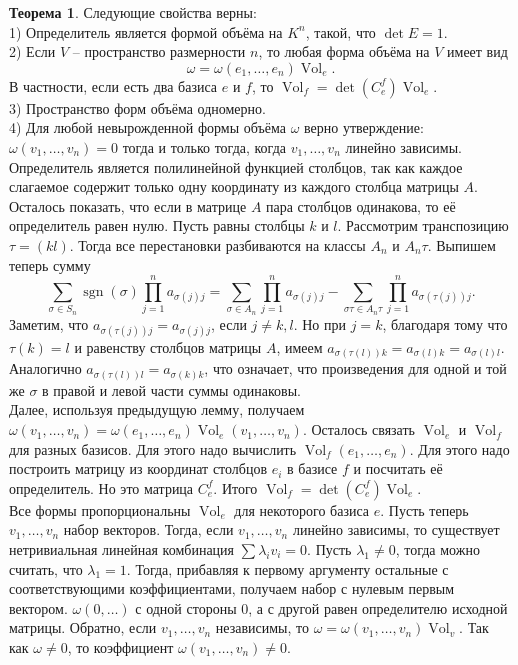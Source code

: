 \documentclass[10pt,a4paper,oneside]{book} %
\theoremstyle{definition}
\newtheorem{thm}{Теорема}
\newcommand{\Vol}{\operatorname{Vol}}
\newcommand{\sgn}{\operatorname{sgn}}
\begin{document}
\begin{thm} Следующие свойства верны:\\
1) Определитель является формой объёма на $K^n$, такой, что $\det E=1$.\\
2) Если $V$ -- пространство размерности $n$, то любая форма объёма на $V$ имеет вид $$\omega=\omega(e_1,\dots,e_n)\Vol_e.$$
В частности, если есть два базиса $e$ и $f$, то $\Vol_{f}=\det(C^f_{e}) \Vol_{e}$.\\
3) Пространство форм объёма одномерно.\\
4) Для любой невырожденной формы объёма $\omega$ верно утверждение: $\omega(v_1,\dots,v_n)=0$ тогда и только тогда, когда $v_1,\dots,v_n$ линейно зависимы.
\proof Определитель является полилинейной функцией столбцов, так как  каждое слагаемое содержит только одну координату из каждого столбца матрицы $A$. Осталось показать, что если в матрице $A$ пара столбцов одинакова, то её определитель равен нулю.
Пусть равны столбцы $k$ и $l$. Рассмотрим транспозицию $\tau=(kl)$. Тогда все перестановки разбиваются на классы $A_n$ и $A_n\tau$. Выпишем теперь сумму
$$\sum_{\sigma \in S_n} \sgn(\sigma)\prod_{j=1}^n a_{\sigma(j)j} = \sum_{\sigma \in A_n} \prod_{j=1}^n a_{\sigma(j)j}- \sum_{\sigma\tau \in A_n\tau} \prod_{j=1}^n a_{\sigma(\tau(j))j}.$$
Заметим, что $a_{\sigma(\tau(j))j}=a_{\sigma(j)j}$, если $j\neq k,l$. Но при  $j=k$, благодаря тому что $\tau(k)=l$  и равенству столбцов матрицы $A$, имеем $a_{\sigma(\tau(l))k}=a_{\sigma(l)k}=a_{\sigma(l)l}$. Аналогично $a_{\sigma(\tau(l))l}=a_{\sigma(k)k}$, что означает, что произведения для одной и той же $\sigma$ в правой и левой части суммы одинаковы.\\

Далее, используя предыдущую лемму, получаем $\omega(v_1,\dots,v_n)=\omega(e_1,\dots,e_n)\Vol_e(v_1,\dots,v_n)$. Осталось связать $\Vol_e$ и $\Vol_f$ для разных базисов. Для этого надо вычислить $\Vol_f(e_1,\dots,e_n)$. Для этого надо построить матрицу из координат столбцов $e_i$ в базисе $f$ и посчитать её определитель. Но это матрица $C_{e}^f$. Итого $\Vol_{f}=\det(C^f_{e}) \Vol_{e}$. \\
Все формы пропорциональны $\Vol_e$ для некоторого базиса $e$.
Пусть теперь $v_1,\dots,v_n$ набор векторов. Тогда, если $v_1,\dots,v_n$ линейно зависимы, то существует нетривиальная линейная комбинация $\sum \lambda_i v_i=0$. Пусть $\lambda_1\neq 0$, тогда можно считать, что $\lambda_1=1$. Тогда, прибавляя к первому аргументу остальные с соответствующими коэффициентами, получаем набор с нулевым первым вектором. $\omega(0,\dots)$ с одной стороны 0, а с другой равен определителю исходной матрицы.
Обратно, если $v_1,\dots,v_n$ независимы, то $\omega=\omega(v_1,\dots,v_n)\Vol_v$. Так как $\omega \neq 0$, то коэффициент $\omega(v_1, \dots,v_n)\neq 0$.
\endproof
\end{thm}
\end{document}
